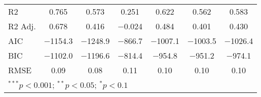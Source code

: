 \begin{longtable}{@{\extracolsep{-3pt}}lcccccc}
R2 & \num{0.765} & \num{0.573} & \num{0.251} & \num{0.622} & \num{0.562} & \num{0.583}\\
R2 Adj. & \num{0.678} & \num{0.416} & \num{-0.024} & \num{0.484} & \num{0.401} & \num{0.430}\\
AIC & \num{-1154.3} & \num{-1248.9} & \num{-866.7} & \num{-1007.1} & \num{-1003.5} & \num{-1026.4}\\
BIC & \num{-1102.0} & \num{-1196.6} & \num{-814.4} & \num{-954.8} & \num{-951.2} & \num{-974.1}\\
RMSE & \num{0.09} & \num{0.08} & \num{0.11} & \num{0.10} & \num{0.10} & \num{0.10}\\
\bottomrule
\multicolumn{7}{l}{\scriptsize{$^{***}p<0.001$; $^{**}p<0.05$; $^{*}p<0.1$}}
\label{table:UnitFE_Robst_RQ1}
\end{longtable}
